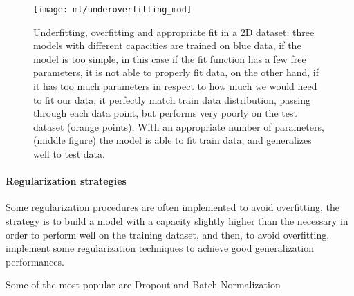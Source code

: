 \documentclass[11pt]{report}
\begin{document}
\begin{figure}
\centering
\texttt{[image: ml/underoverfitting\_mod]}
\caption{Underfitting, overfitting and appropriate fit in a 2D dataset: three models with different capacities are trained on blue data, if the model is too simple, in this case if the fit function has a few free parameters, it is not able to properly fit data, on the other hand, if it has too much parameters in respect to how much we would need to fit our data, it perfectly match train data distribution, passing through each data point, but performs very poorly on the test dataset (orange points). With an appropriate number of parameters, (middle figure) the model is able to fit train data, and generalizes well to test data.
}
\label{}
\end{figure}

\paragraph{Regularization strategies} \hfill

\noindent Some regularization procedures are often implemented to avoid overfitting, the strategy is to build a model with a capacity slightly higher than the necessary in order to perform well on the training dataset, and then, to avoid overfitting, implement some regularization techniques to achieve good generalization performances.

Some of the most popular are Dropout and Batch-Normalization
\end{document}
